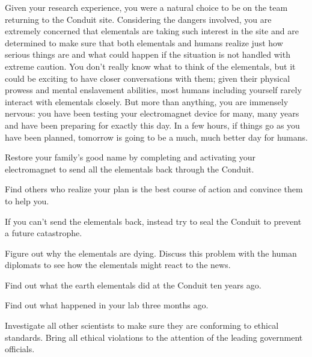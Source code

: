 \documentclass[char]{guildcamp1}
\begin{document}
Given your research experience, you were a natural choice to be on the team returning to the Conduit site. Considering the dangers involved, you are extremely concerned that elementals are taking such interest in the site and are determined to make sure that both elementals and humans realize just how serious things are and what could happen if the situation is not handled with extreme caution. You don't really know what to think of the elementals, but it could be exciting to have closer conversations with them; given their physical prowess and mental enslavement abilities, most humans including yourself rarely interact with elementals closely. But more than anything, you are immensely nervous: you have been testing your electromagnet device for many, many years and have been preparing for exactly this day. In a few hours, if things go as you have been planned, tomorrow is going to be a much, much better day for humans.


\begin{itemz}[Goals]
  \item Restore your family's good name by completing and activating your electromagnet to send all the elementals back through the Conduit.
  \item Find others who realize your plan is the best course of action and convince them to help you. %
  \item If you can't send the elementals back, instead try to seal the Conduit to prevent a future catastrophe.
  \item Figure out why the elementals are dying. Discuss this problem with the human diplomats to see how the elementals might react to the news.
  \item Find out what the earth elementals did at the Conduit ten years ago.
  \item Find out what happened in your lab three months ago.
  \item Investigate all other scientists to make sure they are conforming to ethical standards. Bring all ethical violations to the attention of the leading government officials.
\end{itemz}
\end{document}
